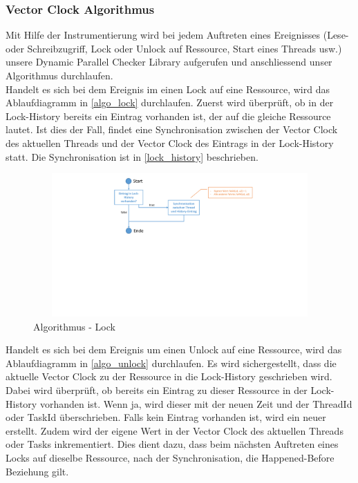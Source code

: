 \documentclass[10pt,a4paper]{article}
\begin{document}
\subsubsection{Vector Clock Algorithmus}\label{vector_algorithm}
Mit Hilfe der Instrumentierung wird bei jedem Auftreten eines Ereignisses (Lese- oder Schreibzugriff, Lock oder Unlock auf Ressource, Start eines Threads usw.) unsere Dynamic Parallel Checker Library aufgerufen und anschliessend unser Algorithmus durchlaufen.\\[0.3cm]
Handelt es sich bei dem Ereignis im einen Lock auf eine Ressource, wird das Ablaufdiagramm in \autoref{algo_lock} durchlaufen. Zuerst wird überprüft, ob in der Lock-History bereits ein Eintrag vorhanden ist, der auf die gleiche Ressource lautet. Ist dies der Fall, findet eine Synchronisation zwischen der Vector Clock des aktuellen Threads und der Vector Clock des Eintrags in der Lock-History statt. Die Synchronisation ist in \ref{lock_history} beschrieben.\\
\begin{figure}[H]
\centering
	\includegraphics[width=14cm,height=5.5cm,trim=70mm 110mm 70mm 5mm, clip]{images/Lock.pdf}
\caption{Algorithmus - Lock}\label{algo_lock}
\end{figure}
Handelt es sich bei dem Ereignis um einen Unlock auf eine Ressource, wird das Ablaufdiagramm in \autoref{algo_unlock} durchlaufen. Es wird sichergestellt, dass die aktuelle Vector Clock zu der Ressource in die Lock-History geschrieben wird. Dabei wird überprüft, ob bereits ein Eintrag zu dieser Ressource in der Lock-History vorhanden ist. Wenn ja, wird dieser mit der neuen Zeit und der ThreadId oder TaskId überschrieben. Falls kein Eintrag vorhanden ist, wird ein neuer erstellt. Zudem wird der eigene Wert in der Vector Clock des aktuellen Threads oder Tasks inkrementiert. Dies dient dazu, dass beim nächsten Auftreten eines Locks auf dieselbe Ressource, nach der Synchronisation, die Happened-Before Beziehung gilt. \\
\end{document}
